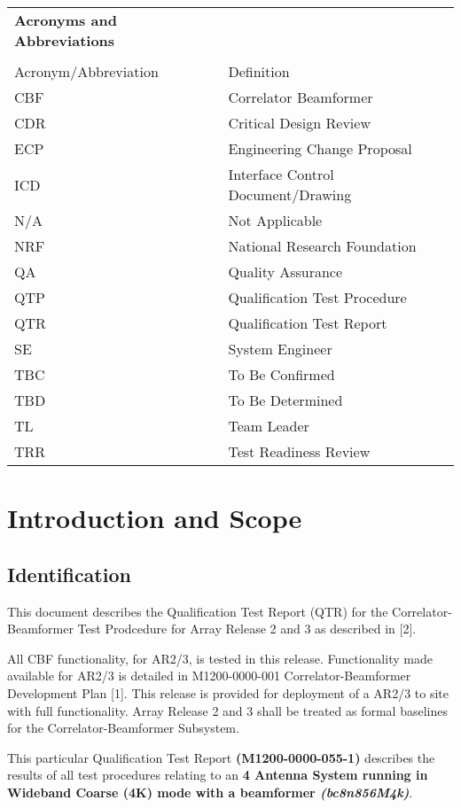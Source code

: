 \begin{longtable}{ll}
	{\bf\LARGE Acronyms and Abbreviations} & \\\\
	Acronym/Abbreviation & Definition \\
	CBF & Correlator Beamformer \\
	CDR & Critical Design Review \\
	ECP & Engineering Change Proposal \\
	ICD & Interface Control Document/Drawing \\
	N/A & Not Applicable \\
	NRF & National Research Foundation \\
	QA  & Quality Assurance \\
	QTP & Qualification Test Procedure \\
	QTR & Qualification Test Report \\
	SE  & System Engineer \\
	TBC & To Be Confirmed \\
	TBD & To Be Determined \\
	TL  & Team Leader \\
	TRR & Test Readiness Review \\
\end{longtable}

\chapter{Introduction and Scope}
\section{Identification}
This document describes the Qualification Test Report (QTR) for the Correlator-Beamformer Test Prodcedure for Array Release 2 and 3 as described in [2].\newline

All CBF functionality, for AR2/3, is tested in this release. Functionality made available for AR2/3 is detailed in M1200-0000-001 Correlator-Beamformer Development Plan [1]. This release is provided for deployment of a AR2/3 to site with full functionality. Array Release 2 and 3 shall be treated as formal baselines for the Correlator-Beamformer Subsystem.\newline

This particular Qualification Test Report {\bf (M1200-0000-055-1)} describes the results of all test procedures relating to an {\bf 4 Antenna System running in Wideband Coarse (4K) mode with a beamformer \it{(bc8n856M4k)}}.
